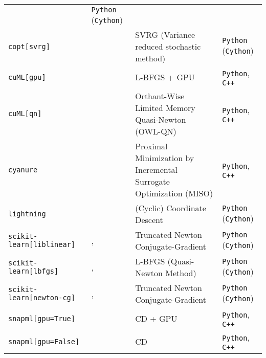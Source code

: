 \documentclass{article}
\begin{document}
\begin{table}[h]
\begin{tabular}{p{3.2cm} p{3.3cm} p{3cm} l}
                          &\texttt{Python} (\texttt{Cython})\\
  \texttt{copt[svrg]} &\citet{Pedregosa_20}
                           & SVRG (Variance reduced stochastic method)
                           & \texttt{Python} (\texttt{Cython})\\
  \texttt{cuML[gpu]} & \citet{Raschka2020a}
                     & L-BFGS + GPU
                     & \texttt{Python}, \texttt{C++}\\
  \texttt{cuML[qn]} & \citet{Raschka2020a}
                     & Orthant-Wise Limited Memory Quasi-Newton (OWL-QN)
                     & \texttt{Python}, \texttt{C++}\\
  \texttt{cyanure} & \citet{Mairal19}
                     & Proximal Minimization by Incremental Surrogate Optimization (MISO)
                     & \texttt{Python}, \texttt{C++} \\
  \texttt{lightning} & \citet{Blondel2016}
                         & (Cyclic) Coordinate Descent
                         & \texttt{Python} (\texttt{Cython})\\
  \texttt{scikit-learn[liblinear]} &\citet{Pedregosa_11}, \citet{Fan2008}
                                   & Truncated Newton Conjugate-Gradient
                                   & \texttt{Python} (\texttt{Cython})\\
  \texttt{scikit-learn[lbfgs]} & \citet{Pedregosa_11}, \citet{2020SciPy-NMeth}
                               & L-BFGS (Quasi-Newton Method)
                               & \texttt{Python} (\texttt{Cython})\\
  \texttt{scikit-learn[newton-cg]} &\citet{Pedregosa_11}, \citet{ 2020SciPy-NMeth}
                     & Truncated Newton Conjugate-Gradient
                     & \texttt{Python} (\texttt{Cython})\\
  \texttt{snapml[gpu=True]} & \citet{Dunner_18}
                            & CD + GPU
                            & \texttt{Python}, \texttt{C++}\\
  \texttt{snapml[gpu=False]} &\citet{Dunner_18}
                             & CD
                             & \texttt{Python}, \texttt{C++}\\
  \bottomrule
\end{tabular}
\label{table:algo-logregl1-benchmark}
\end{table}
\end{document}
